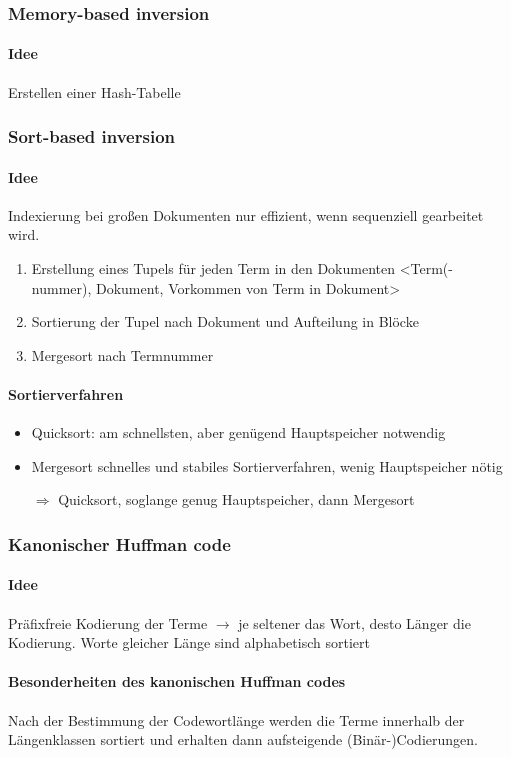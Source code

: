 \documentclass{article}
\begin{document}
\subsubsection{Memory-based inversion}
\paragraph{Idee} Erstellen einer Hash-Tabelle

\subsubsection{Sort-based inversion}
\paragraph{Idee} Indexierung bei großen Dokumenten nur effizient, wenn sequenziell gearbeitet wird.
\begin{enumerate}
\item Erstellung eines Tupels für jeden Term in den Dokumenten <Term(-nummer), Dokument, Vorkommen von Term in Dokument>
\item Sortierung der Tupel nach Dokument und Aufteilung in Blöcke
\item Mergesort nach Termnummer
\end{enumerate}
\paragraph{Sortierverfahren}
\begin{itemize}
\item Quicksort: am schnellsten, aber genügend Hauptspeicher notwendig
\item Mergesort schnelles und stabiles Sortierverfahren, wenig Hauptspeicher nötig
\item[$\Rightarrow$] Quicksort, soglange genug Hauptspeicher, dann Mergesort
\end{itemize}

\subsubsection{Kanonischer Huffman code}
\paragraph{Idee} Präfixfreie Kodierung der Terme $\rightarrow$ je seltener das Wort, desto Länger die Kodierung. Worte gleicher Länge sind alphabetisch sortiert
\paragraph{Besonderheiten des kanonischen Huffman codes} Nach der Bestimmung der Codewortlänge werden die Terme innerhalb der Längenklassen sortiert und erhalten dann aufsteigende (Binär-)Codierungen.
\end{document}
